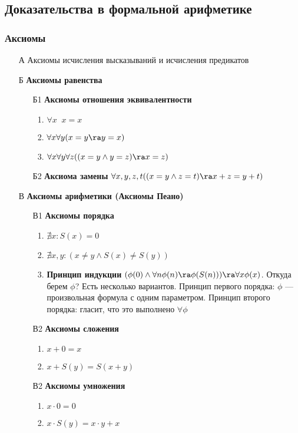 \subsection{Доказательства в формальной арифметике}
\subsubsection{Аксиомы}
\begin{enumerate}
    \item[А] Аксиомы исчисления высказываний и исчисления предикатов
    \item[Б] \textbf{Аксиомы равенства} 
    \begin{enumerate}
        \item[Б1] \textbf{Аксиомы отношения эквивалентности}
        \begin{enumerate}
            \item \(\forall x\;\;x = x\)
            \item \(\forall x \forall y (x = y \ra y = x)\) 
            \item \(\forall x \forall y \forall z ((x = y \wedge y = z) \ra x = z)\)
        \end{enumerate}
        \item[Б2] \textbf{Аксиома замены} \(\forall x, y, z, t ((x = y \wedge z = t) \ra x + z = y + t)\)
    \end{enumerate}
    \item[В] \textbf{Аксиомы арифметики (Аксиомы Пеано)}
    \begin{enumerate}
        \item[В1] \textbf{Аксиомы порядка}
        \begin{enumerate}
            \item \(\nexists x: S(x) = 0\)
            \item \(\nexists x, y: (x \ne y \wedge S(x) \ne S(y))\)
            \item \textbf{Принцип индукции} \((\phi(0) \wedge \forall n \phi(n) \ra \phi(S(n))) \ra \forall x \phi(x)\).
            Откуда берем \(\phi\)? Есть несколько вариантов. Принцип первого порядка: \(\phi\) --- произвольная формула с одним параметром. Принцип второго порядка: гласит, что это выполнено \(\forall \phi\)
        \end{enumerate}
        \item[В2] \textbf{Аксиомы сложения}
        \begin{enumerate}
            \item \(x + 0 = x\)
            \item \(x + S(y) = S(x + y)\)
        \end{enumerate}
        \item[В2] \textbf{Аксиомы умножения}
        \begin{enumerate}
            \item \(x \cdot 0 = 0 \)
            \item \(x \cdot S(y) = x\cdot y + x\)
        \end{enumerate}
    \end{enumerate}
\end{enumerate}

